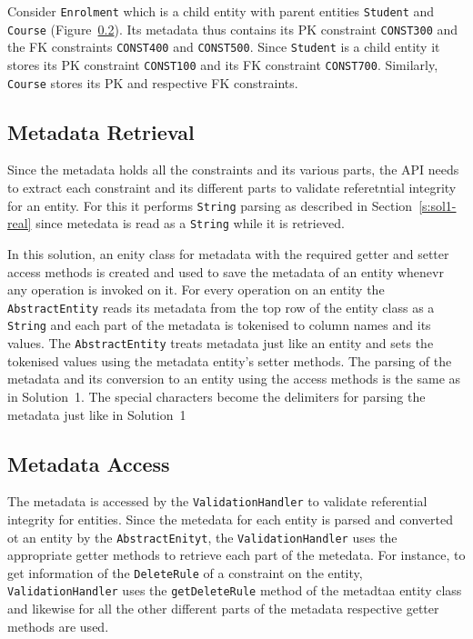 	Consider \texttt{Enrolment}  which is a child entity with parent entities
	\texttt{Student} and \texttt{Course} (Figure~\ref{}). Its metadata thus
	contains its \ac{PK} constraint \texttt{CONST300} and the \ac{FK} constraints
	\texttt{CONST400} and \texttt{CONST500}. Since \texttt{Student} is a child
	entity it  stores its \ac{PK} constraint \texttt{CONST100} and its \ac{FK}
	constraint \texttt{CONST700}. Similarly, \texttt{Course} stores its \ac{PK} and
	respective \ac{FK} constraints.

	\begin{figure}
	\end{figure}
	
	\subsection{Metadata Retrieval}
	Since the metadata holds all the constraints and its various parts, the
	\ac{API} needs to extract each constraint and its different parts to validate
	referetntial integrity for an entity. For this it performs \texttt{String}
	parsing as described in Section~\ref{s:sol1-real} since metedata is read as a
	\texttt{String} while it is retrieved.
	
	In this solution, an enity class
	for metadata with the required getter and setter access methods is created and
	used to save the metadata of an entity whenevr any operation is invoked on it.
	For every operation on an entity the \texttt{AbstractEntity}
	reads its metadata from the top row of the entity class as a \texttt{String}
	and each part of the metadata is tokenised to column names and its values.
	The \texttt{AbstractEntity} treats metadata just like an
	entity and sets the tokenised values using the metadata entity's setter
	methods.
	The parsing of the metadata and its conversion to an entity using the access methods is the same as
	in Solution~1. The special characters become the delimiters for parsing the
	metadata just like in Solution~1
	
	\subsection{Metadata Access}
	The metadata is accessed by the \texttt{ValidationHandler} to
	validate referential integrity for entities. Since the metedata for each entity is
	parsed and converted ot an entity by the \texttt{AbstractEnityt}, 
	the \texttt{ValidationHandler} uses the appropriate getter methods to retrieve
	each part of the metedata. For instance, to get information of
	the \texttt{DeleteRule} of a constraint on the entity,
	\texttt{ValidationHandler} uses the \texttt{getDeleteRule} method of the
	metadtaa entity class and likewise for all the other different parts
	of the metadata respective getter methods are used.
	
